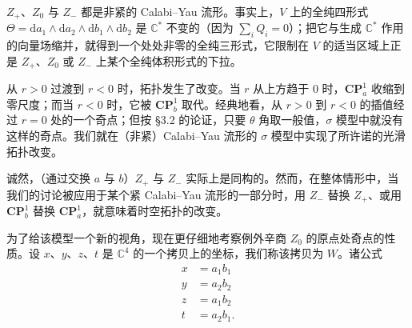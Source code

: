 
$Z_{+}$、$Z_{0}$ 与 $Z_{-}$ 都是非紧的 Calabi--Yau 流形。事实上，$V$ 上的全纯四形式 $\Theta=\mathrm{d}a_{1}\wedge\mathrm{d}a_{2}\wedge\mathrm{d}b_{1}\wedge\mathrm{d}b_{2}$ 是 $\mathbb{C}^{*}$ 不变的（因为 $\sum_{i}Q_{i}=0$）；把它与生成 $\mathbb{C}^{*}$ 作用的向量场缩并，就得到一个处处非零的全纯三形式，它限制在 $V$ 的适当区域上正是 $Z_{+}$、$Z_{0}$ 或 $Z_{-}$ 上某个全纯体积形式的下拉。


从 $r>0$ 过渡到 $r<0$ 时，拓扑发生了改变。当 $r$ 从上方趋于 $0$ 时，$\mathbf{CP}^{1}_{a}$ 收缩到零尺度；而当 $r<0$ 时，它被 $\mathbf{CP}^{1}_{b}$ 取代。经典地看，从 $r>0$ 到 $r<0$ 的插值经过 $r=0$ 处的一个奇点；但按 §3.2 的论证，只要 $\theta$ 角取一般值，$\sigma$ 模型中就没有这样的奇点。我们就在（非紧）Calabi--Yau 流形的 $\sigma$ 模型中实现了所许诺的光滑拓扑改变。

诚然，（通过交换 $a$ 与 $b$）$Z_{+}$ 与 $Z_{-}$ 实际上是同构的。然而，在整体情形中，当我们的讨论被应用于某个紧 Calabi--Yau 流形的一部分时，用 $Z_{-}$ 替换 $Z_{+}$、或用 $\mathbf{CP}^{1}_{b}$ 替换 $\mathbf{CP}^{1}_{a}$，就意味着时空拓扑的改变。

为了给该模型一个新的视角，现在更仔细地考察例外辛商 $Z_{0}$ 的原点处奇点的性质。设 $x$、$y$、$z$、$t$ 是 $\mathbb{C}^{4}$ 的一个拷贝上的坐标，我们称该拷贝为 $W$。诸公式
\begin{equation}
\tag{5.39}
\begin{aligned}
x&=a_{1}b_{1}\\
y&=a_{2}b_{2}\\
z&=a_{1}b_{2}\\
t&=a_{2}b_{1}.
\end{aligned}
\end{equation}

